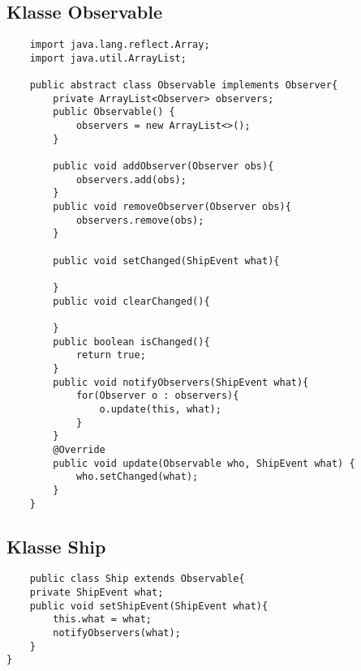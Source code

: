 \documentclass[12pt,a4paper,oneside,ngerman]{article}
\begin{document}
\subsection*{Klasse Observable}
\begin{lstlisting}
	import java.lang.reflect.Array;
	import java.util.ArrayList;
	
	public abstract class Observable implements Observer{
		private ArrayList<Observer> observers;
		public Observable() {
			observers = new ArrayList<>();
		}
	
		public void addObserver(Observer obs){
			observers.add(obs);
		}
		public void removeObserver(Observer obs){
			observers.remove(obs);
		}
	
		public void setChanged(ShipEvent what){
	
		}
		public void clearChanged(){
	
		}
		public boolean isChanged(){
			return true;
		}
		public void notifyObservers(ShipEvent what){
			for(Observer o : observers){
				o.update(this, what);
			}
		}
		@Override
		public void update(Observable who, ShipEvent what) {
			who.setChanged(what);
		}
	}

\end{lstlisting}
\subsection*{Klasse Ship}
\begin{lstlisting}
	public class Ship extends Observable{
    private ShipEvent what;
    public void setShipEvent(ShipEvent what){
        this.what = what;
        notifyObservers(what);
    }
}
\end{lstlisting}
\end{document}

